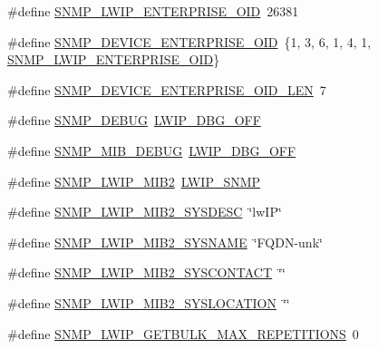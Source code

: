 \begin{DoxyCompactItemize}
\item 
\#define \hyperlink{group__snmp__opts_ga868bfef6efe05515c86291137a633479}{S\+N\+M\+P\+\_\+\+L\+W\+I\+P\+\_\+\+E\+N\+T\+E\+R\+P\+R\+I\+S\+E\+\_\+\+O\+ID}~26381
\item 
\#define \hyperlink{group__snmp__opts_ga09118b734e85df152af098744e888b34}{S\+N\+M\+P\+\_\+\+D\+E\+V\+I\+C\+E\+\_\+\+E\+N\+T\+E\+R\+P\+R\+I\+S\+E\+\_\+\+O\+ID}~\{1, 3, 6, 1, 4, 1, \hyperlink{group__snmp__opts_ga868bfef6efe05515c86291137a633479}{S\+N\+M\+P\+\_\+\+L\+W\+I\+P\+\_\+\+E\+N\+T\+E\+R\+P\+R\+I\+S\+E\+\_\+\+O\+ID}\}
\item 
\#define \hyperlink{group__snmp__opts_ga9e39ba5308f5c7ac5296c7d05fdfa97f}{S\+N\+M\+P\+\_\+\+D\+E\+V\+I\+C\+E\+\_\+\+E\+N\+T\+E\+R\+P\+R\+I\+S\+E\+\_\+\+O\+I\+D\+\_\+\+L\+EN}~7
\item 
\#define \hyperlink{group__snmp__opts_gac041000361342f51ad5ee5d8f6254e02}{S\+N\+M\+P\+\_\+\+D\+E\+B\+UG}~\hyperlink{group__debugging__levels_gadab1cdc3f45939a3a5c9a3d7e04987e1}{L\+W\+I\+P\+\_\+\+D\+B\+G\+\_\+\+O\+FF}
\item 
\#define \hyperlink{group__snmp__opts_gac12240265db443eaf9d31d187e586c16}{S\+N\+M\+P\+\_\+\+M\+I\+B\+\_\+\+D\+E\+B\+UG}~\hyperlink{group__debugging__levels_gadab1cdc3f45939a3a5c9a3d7e04987e1}{L\+W\+I\+P\+\_\+\+D\+B\+G\+\_\+\+O\+FF}
\item 
\#define \hyperlink{group__snmp__opts_gaab667d48f48ee89f8bdbc7f134e6037d}{S\+N\+M\+P\+\_\+\+L\+W\+I\+P\+\_\+\+M\+I\+B2}~\hyperlink{group__snmp__opts_gaf4900859dc53f19f5f67cc34e48ad68c}{L\+W\+I\+P\+\_\+\+S\+N\+MP}
\item 
\#define \hyperlink{group__snmp__opts_gae93a105b421a2ca91e862da5087cec73}{S\+N\+M\+P\+\_\+\+L\+W\+I\+P\+\_\+\+M\+I\+B2\+\_\+\+S\+Y\+S\+D\+E\+SC}~\char`\"{}lw\+IP\char`\"{}
\item 
\#define \hyperlink{group__snmp__opts_ga80ba46f9517a51b5477f13082b2bcf98}{S\+N\+M\+P\+\_\+\+L\+W\+I\+P\+\_\+\+M\+I\+B2\+\_\+\+S\+Y\+S\+N\+A\+ME}~\char`\"{}F\+Q\+DN-\/unk\char`\"{}
\item 
\#define \hyperlink{group__snmp__opts_ga1a57501c615b630d363e0af1a504e683}{S\+N\+M\+P\+\_\+\+L\+W\+I\+P\+\_\+\+M\+I\+B2\+\_\+\+S\+Y\+S\+C\+O\+N\+T\+A\+CT}~\char`\"{}\char`\"{}
\item 
\#define \hyperlink{group__snmp__opts_ga311cec98c8f7e4851d325fffe96cf8d9}{S\+N\+M\+P\+\_\+\+L\+W\+I\+P\+\_\+\+M\+I\+B2\+\_\+\+S\+Y\+S\+L\+O\+C\+A\+T\+I\+ON}~\char`\"{}\char`\"{}
\item 
\#define \hyperlink{group__snmp__opts_ga5a24152aa5f3c2837b9a3145aa3c59f3}{S\+N\+M\+P\+\_\+\+L\+W\+I\+P\+\_\+\+G\+E\+T\+B\+U\+L\+K\+\_\+\+M\+A\+X\+\_\+\+R\+E\+P\+E\+T\+I\+T\+I\+O\+NS}~0
\end{DoxyCompactItemize}


